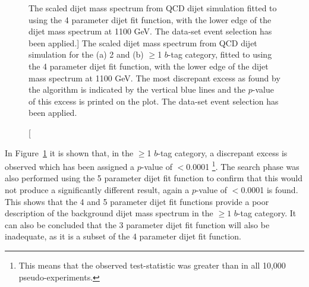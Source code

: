 \begin{figure}[!htb]
 \vspace{-0.2em}
  \begin{center}
   \captionsetup[subfigure]{aboveskip=0pt,justification=centering}
  \end{center}
  \vspace{-1em}
  \caption
      [The scaled dijet mass spectrum from QCD dijet simulation
        fitted to using the 4 parameter dijet fit function, with the lower edge of the dijet mass spectrum at 1100 GeV.
        The \summer{} data-set event selection has been applied.]
      {The scaled dijet mass spectrum from QCD dijet simulation for the (a) 2 and (b) $\geq$1 $b$-tag category,
        fitted to using the 4 parameter dijet fit function, with the lower edge of the dijet mass spectrum at 1100 GeV.
        The most discrepant excess as found by the \bh{} algorithm is indicated by the vertical blue lines and the \mbox{$p$-value} of this excess is printed on the plot.         
        The \summer{} data-set event selection has been applied.}
 \label{fig:Short_4para_1100_figure1}
 \vspace{-0.5em}
\end{figure}


In Figure~\ref{fig:Short_4para_1100_figure1} it is shown that, in the $\geq$1 $b$-tag category,
a discrepant excess is observed which has been assigned a \bh{} \mbox{$p$-value} of $<$0.0001
\footnote{This means that the observed \bh{} test-statistic was greater than in all 10,000 pseudo-experiments.}.
The search phase was also performed using the 5 parameter dijet fit function to confirm
that this would not produce a significantly different result,
again a \bh{} \mbox{$p$-value} of $<$0.0001 is found.
This shows that the 4 and 5 parameter dijet fit functions provide a poor description
of the background dijet mass spectrum in the $\geq1$ $b$-tag category.
It can also be concluded that the 3 parameter dijet fit function will also be inadequate, as it is a subset of the 4 parameter dijet fit function.


